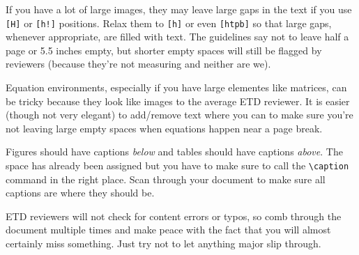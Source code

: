 \begin{todolist}
\item If you have a lot of large images, they may leave large gaps in the text if you use \texttt{[H]} or \texttt{[h!]} positions. Relax them to \texttt{[h]} or even \texttt{[htpb]} so that large gaps, whenever appropriate, are filled with text. The guidelines say not to leave half a page or 5.5 inches empty, but shorter empty spaces will still be flagged by reviewers (because they're not measuring and neither are we). 
\item Equation environments, especially if you have large elementes like matrices, can be tricky because they look like images to the average ETD reviewer. It is easier (though not very elegant) to add/remove text where you can to make sure you're not leaving large empty spaces when equations happen near a page break.
\item Figures should have captions {\em below} and tables should have captions {\em above}. The space has already been assigned but you have to make sure to call the \verb|\caption| command in the right place. Scan through your document to make sure all captions are where they should be.
\item ETD reviewers will not check for content errors or typos, so comb through the document multiple times and make peace with the fact that you will almost certainly miss something. Just try not to let anything major slip through. 
\end{todolist}
